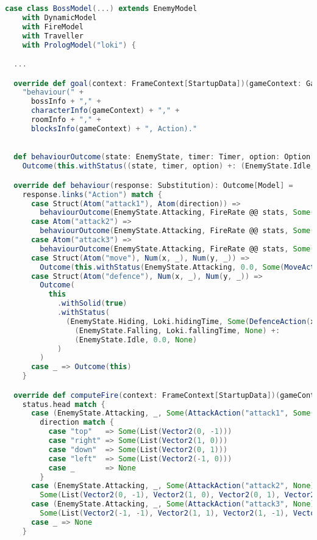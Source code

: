 \begin{lstlisting}[language=Scala]
case class BossModel(...) extends EnemyModel
    with DynamicModel
    with FireModel
    with Traveller
    with PrologModel("loki") {

  ...

  override def goal(context: FrameContext[StartupData])(gameContext: GameContext): String =
    "behaviour(" +
      bossInfo + "," +
      characterInfo(gameContext) + "," +
      roomInfo + "," +
      blocksInfo(gameContext) + ", Action)."

  
  def behaviourOutcome(state: EnemyState, timer: Timer, option: Option[EnemyAction]): Outcome[Model] =
    Outcome(this.withStatus((state, timer, option) +: (EnemyState.Idle, 0.0, None)))

  override def behaviour(response: Substitution): Outcome[Model] =
    response.links("Action") match {
      case Struct(Atom("attack1"), Atom(direction)) =>
        behaviourOutcome(EnemyState.Attacking, FireRate @@ stats, Some(AttackAction("attack1", Some(direction))))
      case Atom("attack2") =>
        behaviourOutcome(EnemyState.Attacking, FireRate @@ stats, Some(AttackAction("attack2", None)))
      case Atom("attack3") =>
        behaviourOutcome(EnemyState.Attacking, FireRate @@ stats, Some(AttackAction("attack3", None)))
      case Struct(Atom("move"), Num(x, _), Num(y, _)) =>
        Outcome(this.withStatus(EnemyState.Attacking, 0.0, Some(MoveAction(x.toDouble, y.toDouble))))
      case Struct(Atom("defence"), Num(x, _), Num(y, _)) =>
        Outcome(
          this
            .withSolid(true)
            .withStatus(
              (EnemyState.Hiding, Loki.hidingTime, Some(DefenceAction(x.toDouble, y.toDouble))) +:
                (EnemyState.Falling, Loki.fallingTime, None) +:
                (EnemyState.Idle, 0.0, None)
            )
        )
      case _ => Outcome(this)
    }

  override def computeFire(context: FrameContext[StartupData])(gameContext: GameContext): Option[List[Vector2]] =
    status.head match {
      case (EnemyState.Attacking, _, Some(AttackAction("attack1", Some(direction)))) =>
        direction match {
          case "top"   => Some(List(Vector2(0, -1)))
          case "right" => Some(List(Vector2(1, 0)))
          case "down"  => Some(List(Vector2(0, 1)))
          case "left"  => Some(List(Vector2(-1, 0)))
          case _       => None
        }
      case (EnemyState.Attacking, _, Some(AttackAction("attack2", None))) =>
        Some(List(Vector2(0, -1), Vector2(1, 0), Vector2(0, 1), Vector2(-1, 0)))
      case (EnemyState.Attacking, _, Some(AttackAction("attack3", None))) =>
        Some(List(Vector2(-1, -1), Vector2(1, 1), Vector2(1, -1), Vector2(-1, 1)))
      case _ => None
    }


\end{lstlisting}
